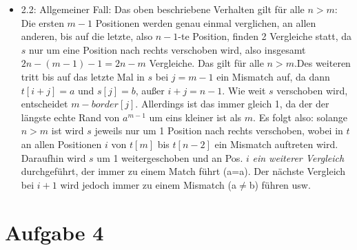 \documentclass[a4paper,10pt,oneside,leqno]{scrartcl}
\begin{document}
\begin{itemize}
\begin{itemize}
  \item 2.2: Allgemeiner Fall:\newline
  Das oben beschriebene Verhalten gilt für alle $n>m$: Die ersten $m-1$ Positionen werden genau einmal verglichen, an allen anderen, bis auf
  die letzte, also $n-1$-te Position, finden 2 Vergleiche statt, da $s$ nur um eine Position nach rechts verschoben wird, also insgesamt
  $2n-(m-1)-1 = 2n-m$ Vergleiche. Das gilt für alle $n>m$.\newline Des weiteren tritt bis auf das letzte Mal in
  $s$ bei $j=m-1$ ein Mismatch auf, da dann $t[i+j] = a$ und $s[j]=b$, außer $i+j=n-1$. Wie weit $s$ verschoben wird, entscheidet
  $m-border[j]$. Allerdings ist das immer gleich 1, da der der längste echte Rand von $a^{m-1}$ um eins kleiner ist als $m$.\newline
  Es folgt also: solange $n>m$ ist wird $s$ jeweils nur um 1 Position nach rechts verschoben, wobei in $t$ an allen Positionen $i$ von $t[m]$ bis
  $t[n-2]$ ein Mismatch auftreten wird. Daraufhin wird $s$ um 1 weitergeschoben und an Pos. $i$ \textit{ein weiterer Vergleich} durchgeführt,
  der immer zu einem Match führt (a=a). Der nächste Vergleich bei $i+1$ wird jedoch immer zu einem Mismatch (a$\neq$b) führen usw.
\end{itemize}

\end{itemize}

\section*{Aufgabe 4}
\end{document}
